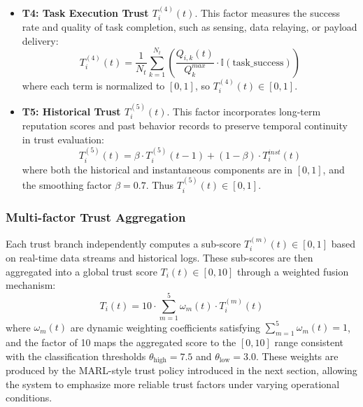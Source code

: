 \documentclass[notspecified,article,submit,moreauthors]{Definitions/mdpi}
\begin{document}
\begin{itemize}
\item \textbf{T4: Task Execution Trust $T_i^{(4)}(t)$}. This factor measures the success rate and quality of task completion, such as sensing, data relaying, or payload delivery:
\begin{equation}\label{eq:T4}
T_i^{(4)}(t) = \frac{1}{N_t} \sum_{k=1}^{N_t} \left( \frac{Q_{i,k}(t)}{Q_k^{max}} \cdot \mathbb{I}(\mathrm{task\_success}) \right)
\end{equation}
where each term is normalized to $[0, 1]$, so $T_i^{(4)}(t) \in [0, 1]$.
\end{itemize}

\begin{itemize}
\item \textbf{T5: Historical Trust $T_i^{(5)}(t)$}. This factor incorporates long-term reputation scores and past behavior records to preserve temporal continuity in trust evaluation:
\begin{equation}\label{eq:T5}
T_i^{(5)}(t) = \beta \cdot T_i^{(5)}(t-1) + (1 - \beta) \cdot T_i^{inst}(t)
\end{equation}
where both the historical and instantaneous components are in $[0, 1]$, and the smoothing factor $\beta = 0.7$. Thus $T_i^{(5)}(t) \in [0, 1]$.
\end{itemize}

\subsubsection{Multi-factor Trust Aggregation}
\label{sec:multi_factor_aggregation}
Each trust branch independently computes a sub-score $T_i^{(m)}(t) \in [0, 1]$ based on real-time data streams and historical logs. These sub-scores are then aggregated into a global trust score $T_i(t) \in [0, 10]$ through a weighted fusion mechanism:
\begin{equation}\label{eq:aggregation}
T_i(t) = 10 \cdot \sum_{m=1}^{5} \omega_m(t) \cdot T_i^{(m)}(t)
\end{equation}
where $\omega_m(t)$ are dynamic weighting coefficients satisfying $\sum_{m=1}^{5} \omega_m(t) = 1$, and the factor of 10 maps the aggregated score to the $[0, 10]$ range consistent with the classification thresholds $\theta_{\text{high}} = 7.5$ and $\theta_{\text{low}} = 3.0$. These weights are produced by the MARL-style trust policy introduced in the next section, allowing the system to emphasize more reliable trust factors under varying operational conditions.
\end{document}
